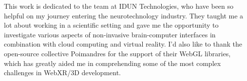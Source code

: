\begin{dedication}

  This work is dedicated to the team at IDUN Technologies, who have been so helpful on my journey entering the neurotechnology industry. They taught me a lot about working in a scientific setting and gave me the opportunity to investigate various aspects of non-invasive brain-computer interfaces in combination with cloud computing and virtual reality. I'd also like to thank the open-source collective Poimandres for the support of their WebGL libraries, which has greatly aided me in comprehending some of the most complex challenges in WebXR/3D development.

\end{dedication}

